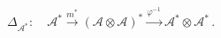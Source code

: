 \(
\Delta_{\mathcal A^*}:\quad
\mathcal A^*
\xrightarrow{m^*}
(\mathcal A\otimes\mathcal A)^*
\xrightarrow{\varphi^{-1}}
\mathcal A^*\otimes\mathcal A^*\,.
\)
